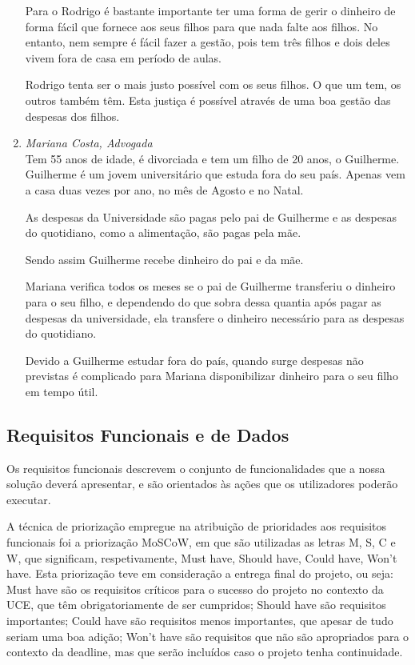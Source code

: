 \documentclass[12pt,a4paper]{article}
\begin{document}
\begin{enumerate}
            Para o Rodrigo é bastante importante ter uma forma de gerir o dinheiro de forma fácil que fornece aos seus filhos para que nada falte aos filhos. No entanto, nem sempre é fácil fazer a gestão, pois tem três filhos e dois deles vivem fora de casa em período de aulas.

            Rodrigo tenta ser o mais justo possível com os seus filhos. O que um tem, os outros também têm. Esta justiça é possível através de uma boa gestão das despesas dos filhos.

      \item \emph{Mariana Costa, Advogada}\\
            Tem 55 anos de idade, é divorciada e tem um filho de 20 anos, o Guilherme. Guilherme é um jovem universitário que estuda fora do seu país. Apenas vem a casa duas vezes por ano, no mês de Agosto e no Natal.

            As despesas da Universidade são pagas pelo pai de Guilherme e as despesas do quotidiano, como a alimentação, são pagas pela mãe.

            Sendo assim Guilherme recebe dinheiro do pai e da mãe.

            Mariana verifica todos os meses se o pai de Guilherme transferiu o dinheiro para o seu filho, e dependendo do que sobra dessa quantia após pagar as despesas da universidade, ela transfere o dinheiro necessário para as despesas do quotidiano.

            Devido a Guilherme estudar fora do país, quando surge despesas não previstas é complicado para Mariana disponibilizar dinheiro para o seu filho em tempo útil.

    \end{enumerate}

  \subsection{Requisitos Funcionais e de Dados}

    Os requisitos funcionais descrevem o conjunto de funcionalidades que a nossa solução deverá apresentar, e são orientados às ações que os utilizadores poderão executar.

    A técnica de priorização empregue na atribuição de prioridades aos requisitos funcionais foi a priorização MoSCoW, em que são utilizadas as letras M, S, C e W, que significam, respetivamente, Must have, Should have, Could have, Won’t have. Esta priorização teve em consideração a entrega final do projeto, ou seja: Must have são os requisitos críticos para o sucesso do projeto no contexto da UCE, que têm obrigatoriamente de ser cumpridos; Should have são requisitos importantes; Could have são requisitos menos importantes, que apesar de tudo seriam uma boa adição; Won’t have são requisitos que não são apropriados para o contexto da deadline, mas que serão incluídos caso o projeto tenha continuidade.
\end{document}

